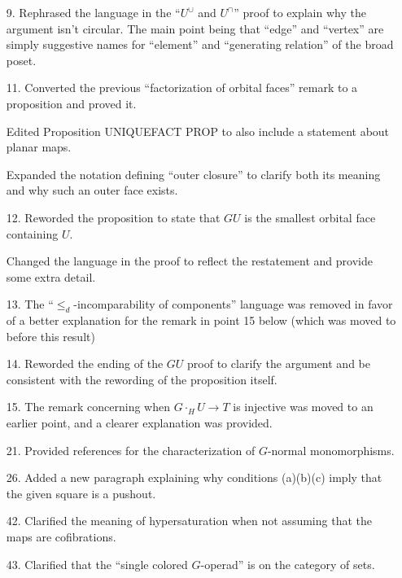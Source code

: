 \documentclass{article}
\begin{document}
\begin{itemize}
\item[9.] Rephrased the language in the ``$U^{\cup}$ and $U^{\cap}$'' proof to explain why the argument isn't circular. The main point being that ``edge'' and ``vertex'' are simply suggestive names for ``element'' and ``generating relation'' of the broad poset.


\item[11.] Converted the previous ``factorization of orbital faces'' remark to a proposition and proved it.

Edited Proposition UNIQUEFACT PROP to also include a statement about planar maps.

Expanded the notation defining ``outer closure'' to clarify both its meaning and why such an outer face exists.


\item[12.] Reworded the proposition to state that $GU$ is the smallest orbital face containing $U$.

Changed the language in the proof to reflect the restatement and provide some extra detail.


\item[13.] The ``$\leq_d$-incomparability of components'' language was removed in favor of a better explanation for the remark in point 15 below (which was moved to before this result)


\item[14.] Reworded the ending of the $GU$ proof to clarify the argument and be consistent with the rewording of the proposition itself.

\item[15.] The remark concerning when $G\cdot_H U \to T$ is injective was moved to an earlier point, and a clearer explanation was provided.

\item[21.] Provided references for the characterization of $G$-normal monomorphisms.
 

\item[26.] Added a new paragraph explaining why conditions (a)(b)(c) imply that the given square is a pushout.


\item[42.] Clarified the meaning of hypersaturation when not assuming that the maps are cofibrations.

\item[43.] Clarified that the ``single colored $G$-operad'' is on the category of sets.


\end{itemize}
\end{document}
